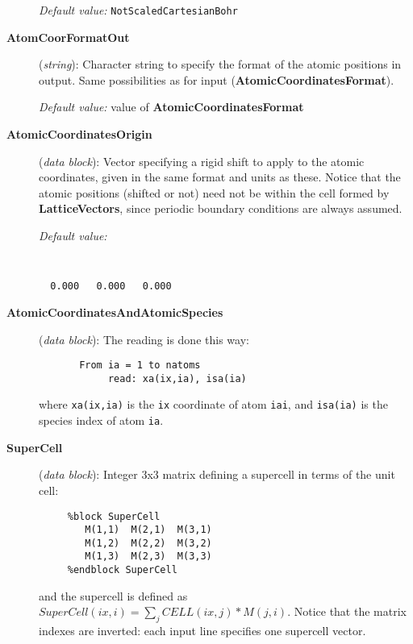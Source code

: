\documentclass[11pt]{article}
\begin{document}
\begin{description}
{\it Default value:} {\tt NotScaledCartesianBohr}


\item[{\bf AtomCoorFormatOut}] ({\it string}): 
Character string to specify the format of the atomic positions in output.
Same possibilities as for input ({\bf AtomicCoordinatesFormat}).

{\it Default value:} value of {\bf AtomicCoordinatesFormat}


\item[{\bf AtomicCoordinatesOrigin}] ({\it data block}): 
Vector specifying a rigid shift to apply to the atomic coordinates,
given in the same format and units as these. Notice that the atomic
positions (shifted or not) need not be within the cell formed by
{\bf LatticeVectors}, since periodic boundary conditions are always
assumed.

{\it Default value:} 
{\tt
\begin{verbatim}
  0.000   0.000   0.000
\end{verbatim}
}


\item[{\bf AtomicCoordinatesAndAtomicSpecies}] ({\it data block}): 
The reading is done this way:
\begin{verbatim}
       From ia = 1 to natoms
            read: xa(ix,ia), isa(ia)
\end{verbatim}
where {\tt xa(ix,ia)} is the {\tt ix} coordinate of atom 
{\tt iai}, and {\tt isa(ia)} is the species index of atom {\tt ia}.


\item[{\bf SuperCell}] ({\it data block}): 
Integer 3x3 matrix defining a supercell in terms of the unit cell: 

\begin{verbatim}
     %block SuperCell
        M(1,1)  M(2,1)  M(3,1) 
        M(1,2)  M(2,2)  M(3,2) 
        M(1,3)  M(2,3)  M(3,3) 
     %endblock SuperCell
\end{verbatim}

and the supercell is defined as
$SuperCell(ix,i) = \sum_j CELL(ix,j)*M(j,i)$.
Notice that the matrix indexes are inverted: each input line 
specifies one supercell vector.


\end{description}
\end{document}
